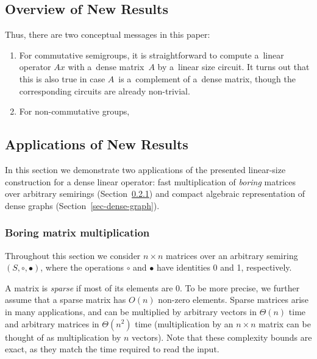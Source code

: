 \documentclass[11pt,letterpaper]{article}
\begin{document}
\subsection{Overview of New Results}

Thus, there are two conceptual messages in this paper:
\begin{enumerate}
\item For commutative semigroups, it is straightforward to compute a~linear operator $Ax$ with a~dense matrix~$A$ by a~linear size circuit. It turns out that this is also true in case $A$~is a~complement of a~dense matrix, though the corresponding circuits are already non-trivial.
\item For non-commutative groups,
\end{enumerate}



\subsection{Applications of New Results}
In this section we demonstrate two applications of the presented linear-size
construction for a dense linear operator: fast multiplication of \emph{boring}
matrices over arbitrary semirings (Section~\ref{sec-boring-matrices}) and
compact algebraic representation of dense graphs
(Section~\ref{sec-dense-graph}).

\subsubsection{Boring matrix multiplication}\label{sec-boring-matrices}

Throughout this section we consider $n \times n$ matrices over an arbitrary
semiring $(S, \circ, \bullet)$, where the operations $\circ$ and $\bullet$ have
identities 0 and 1, respectively.

A matrix is \emph{sparse} if most of its elements are 0. To be more precise, we
further assume that a sparse matrix has $O(n)$ non-zero elements. Sparse
matrices arise in many applications, and can be multiplied by arbitrary vectors
in $\Theta(n)$ time and arbitrary matrices in $\Theta(n^2)$ time (multiplication
by an $n\times n$ matrix can be thought of as multiplication by $n$ vectors).
Note that these complexity bounds are exact, as they match the time required to
read the input.
\end{document}
